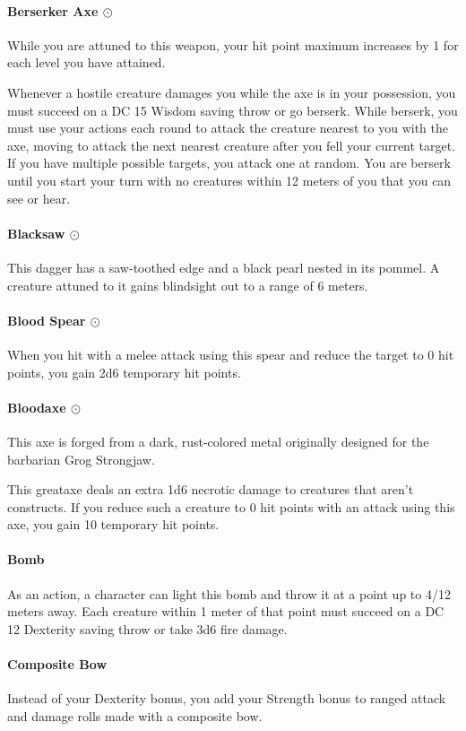     \paragraph{Berserker Axe $\odot$}
        While you are attuned to this weapon, your hit point maximum increases by 1 for each level you have attained.

        Whenever a hostile creature damages you while the axe is in your possession, you must succeed on a DC 15 Wisdom saving throw or go berserk.
        While berserk, you must use your actions each round to attack the creature nearest to you with the axe, moving to attack the next nearest creature after you fell your current target.
        If you have multiple possible targets, you attack one at random.
        You are berserk until you start your turn with no creatures within 12 meters of you that you can see or hear.
    \paragraph{Blacksaw $\odot$}
        This dagger has a saw-toothed edge and a black pearl nested in its pommel.
        A creature attuned to it gains blindsight out to a range of 6 meters.
    \paragraph{Blood Spear $\odot$}
        When you hit with a melee attack using this spear and reduce the target to 0 hit points, you gain 2d6 temporary hit points.
    \paragraph{Bloodaxe $\odot$}
        This axe is forged from a dark, rust-colored metal originally designed for the barbarian Grog Strongjaw.

        This greataxe deals an extra 1d6 necrotic damage to creatures that aren't constructs.
        If you reduce such a creature to 0 hit points with an attack using this axe, you gain 10 temporary hit points.
    \paragraph{Bomb}
        As an action, a character can light this bomb and throw it at a point up to 4/12 meters away.
        Each creature within 1 meter of that point must succeed on a DC 12 Dexterity saving throw or take 3d6 fire damage.
    \paragraph{Composite Bow}
        Instead of your Dexterity bonus, you add your Strength bonus to ranged attack and damage rolls made with a composite bow.
